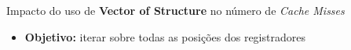 \begin{frame}{Impacto do uso de \textbf{Vector of Structure} no número de \textit{Cache Misses}}
    \begin{itemize}
        \item[] \textbf{Objetivo:} iterar sobre todas as posições dos registradores
    \end{itemize}

    \begin{center}
    \end{center}
    
\end{frame}

